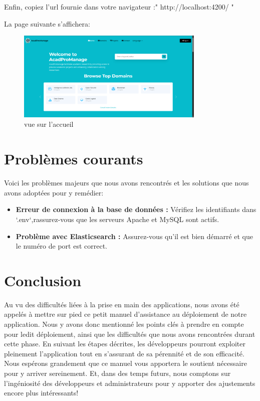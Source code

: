 \documentclass[12pt]{article}
\begin{document}
Enfin, copiez l'url fournie dans votre navigateur :" http://localhost:4200/ "

\vspace{0.7cm}
La page suivante s'affichera:
\smallskip
    \begin{figure}[h]
        \centering
        \includegraphics[width=0.8\textwidth]{./img/accueil.png}
        \caption{vue sur l'accueil}
        \label{fig:vue sur l'accueil}
    \end{figure}

\vspace{0.7cm}

{\fontsize{14}{16}\section*{Problèmes courants }}
Voici les problèmes majeurs que nous avons rencontrés et les solutions que nous avons adoptées pour y remédier:
\medskip
\begin{itemize}
    \item \textbf{Erreur de connexion à la base de données :} Vérifiez les identifiants dans `.env`,rassurez-vous que les serveurs Apache et MySQL sont actifs.
    \item \textbf{Problème avec Elasticsearch :} Assurez-vous qu’il est bien démarré et que le numéro de port est correct.
\end{itemize}

\newpage
{\fontsize{14}{16}\section*{Conclusion}}
Au vu des difficultés liées à la prise en main des applications, nous avons été appelés à mettre sur pied ce petit manuel d'assistance au déploiement de notre application. Nous y avons donc mentionné les points clés à prendre en compte pour ledit déploiement, ainsi que les difficultés que nous avons rencontrées durant cette phase. En suivant les étapes décrites, les développeurs pourront exploiter pleinement l'application tout en s'assurant de sa 
pérennité et de son efficacité. Nous espérons grandement que ce manuel vous apportera le soutient nécessaire pour y arriver sereinement. Et, dans des temps futurs, nous comptons sur l'ingéniosité des développeurs et administrateurs pour y apporter des ajustements encore plus intéressants!
\end{document}

